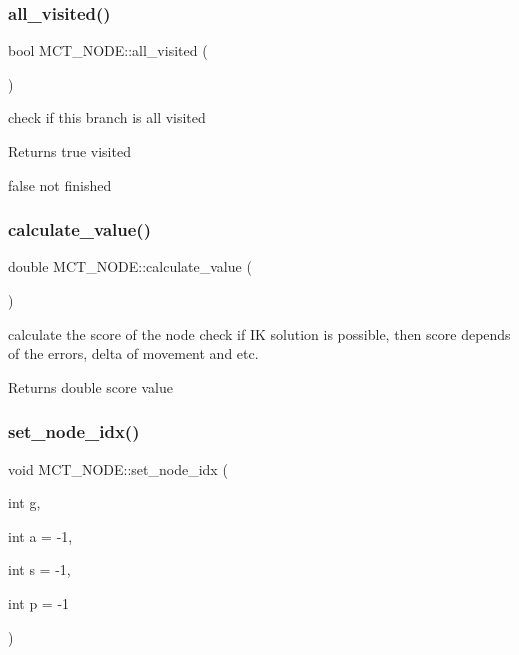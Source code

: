 \subsubsection{\texorpdfstring{all\+\_\+visited()}{all\_visited()}}
{\footnotesize\ttfamily bool M\+C\+T\+\_\+\+N\+O\+D\+E\+::all\+\_\+visited (\begin{DoxyParamCaption}{ }\end{DoxyParamCaption})\hspace{0.3cm}{\ttfamily [private]}}



check if this branch is all visited 

\begin{DoxyReturn}{Returns}
true visited 

false not finished 
\end{DoxyReturn}
\mbox{\label{classMCT__NODE_aae9490861298c2419fe9c86991868c39}} 
\subsubsection{\texorpdfstring{calculate\+\_\+value()}{calculate\_value()}}
{\footnotesize\ttfamily double M\+C\+T\+\_\+\+N\+O\+D\+E\+::calculate\+\_\+value (\begin{DoxyParamCaption}{ }\end{DoxyParamCaption})\hspace{0.3cm}{\ttfamily [private]}}



calculate the score of the node check if IK solution is possible, then score depends of the errors, delta of movement and etc. 

\begin{DoxyReturn}{Returns}
double score value 
\end{DoxyReturn}
\mbox{\label{classMCT__NODE_a04ad1b7ce156c2501819d32047e3e83a}} 
\subsubsection{\texorpdfstring{set\+\_\+node\+\_\+idx()}{set\_node\_idx()}}
{\footnotesize\ttfamily void M\+C\+T\+\_\+\+N\+O\+D\+E\+::set\+\_\+node\+\_\+idx (\begin{DoxyParamCaption}\item[{int}]{g,  }\item[{int}]{a = {\ttfamily -\/1},  }\item[{int}]{s = {\ttfamily -\/1},  }\item[{int}]{p = {\ttfamily -\/1} }\end{DoxyParamCaption})\hspace{0.3cm}{\ttfamily [inline]}}



